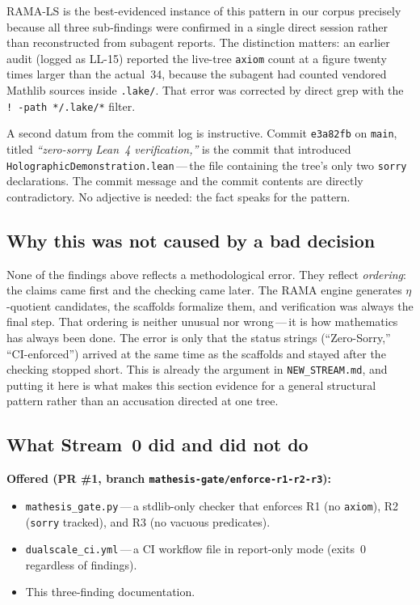 \documentclass[11pt,a4paper]{article}
\theoremstyle{plain}
\theoremstyle{definition}
\theoremstyle{remark}
\begin{document}
RAMA-LS is the best-evidenced instance of this pattern in our corpus
precisely because all three sub-findings were confirmed in a single direct
session rather than reconstructed from subagent reports.
The distinction matters: an earlier audit (logged as LL-15) reported the
live-tree \texttt{axiom} count at a figure twenty times larger than the
actual~34, because the subagent had counted vendored Mathlib sources
inside \texttt{.lake/}.
That error was corrected by direct grep with the
\texttt{!\ -path */.lake/*} filter.

A second datum from the commit log is instructive.
Commit \texttt{e3a82fb} on \texttt{main}, titled
\textit{``zero-sorry Lean~4 verification,''}
is the commit that introduced \texttt{HolographicDemonstration.lean}\,---\,the
file containing the tree's only two \texttt{sorry} declarations.
The commit message and the commit contents are directly contradictory.
No adjective is needed: the fact speaks for the pattern.

\subsection*{Why this was not caused by a bad decision}

None of the findings above reflects a methodological error.
They reflect \emph{ordering}: the claims came first and the checking came
later.
The RAMA engine generates $\eta$-quotient candidates, the scaffolds
formalize them, and verification was always the final step.
That ordering is neither unusual nor wrong\,---\,it is how mathematics
has always been done.
The error is only that the status strings (``Zero-Sorry,'' ``CI-enforced'')
arrived at the same time as the scaffolds and stayed after the checking
stopped short.
This is already the argument in \texttt{NEW\_STREAM.md}, and putting it
here is what makes this section evidence for a general structural pattern
rather than an accusation directed at one tree.

\subsection*{What Stream~0 did and did not do}

\textbf{Offered (PR \#1, branch \texttt{mathesis-gate/enforce-r1-r2-r3}):}
\begin{itemize}
  \item \texttt{mathesis\_gate.py}\,---\,a stdlib-only checker that
    enforces R1 (no \texttt{axiom}), R2 (\texttt{sorry} tracked), and
    R3 (no vacuous predicates).
  \item \texttt{dualscale\_ci.yml}\,---\,a CI workflow file in
    report-only mode (exits~0 regardless of findings).
  \item This three-finding documentation.
\end{itemize}
\end{document}
